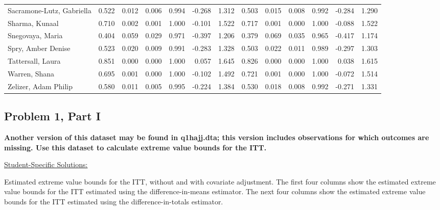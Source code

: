 \documentclass[11pt,notitlepage]{article}
\begin{document}
\begin{table}[h!]
\begin{center}
\begin{tabular}{lrrrrrr|rrrrrr}
  Sacramone-Lutz, Gabriella & 0.522 & 0.012 & 0.006 & 0.994 & -0.268 & 1.312 & 0.503 & 0.015 & 0.008 & 0.992 & -0.284 & 1.290 \\ 
  Sharma, Kunaal & 0.710 & 0.002 & 0.001 & 1.000 & -0.101 & 1.522 & 0.717 & 0.001 & 0.000 & 1.000 & -0.088 & 1.522 \\ 
  Snegovaya, Maria & 0.404 & 0.059 & 0.029 & 0.971 & -0.397 & 1.206 & 0.379 & 0.069 & 0.035 & 0.965 & -0.417 & 1.174 \\ 
  Spry, Amber Denise & 0.523 & 0.020 & 0.009 & 0.991 & -0.283 & 1.328 & 0.503 & 0.022 & 0.011 & 0.989 & -0.297 & 1.303 \\ 
  Tattersall, Laura & 0.851 & 0.000 & 0.000 & 1.000 & 0.057 & 1.645 & 0.826 & 0.000 & 0.000 & 1.000 & 0.038 & 1.615 \\ 
  Warren, Shana & 0.695 & 0.001 & 0.000 & 1.000 & -0.102 & 1.492 & 0.721 & 0.001 & 0.000 & 1.000 & -0.072 & 1.514 \\ 
  Zelizer, Adam Philip & 0.580 & 0.011 & 0.005 & 0.995 & -0.224 & 1.384 & 0.530 & 0.018 & 0.008 & 0.992 & -0.271 & 1.331 \\ 
   \hline
\end{tabular}
\end{center}
\end{table}


\clearpage


\subsection{Problem 1, Part I} {\bf Another version of this dataset may be found in q1hajj.dta; this version includes observations for which outcomes are missing.  Use this dataset to calculate extreme value bounds for the ITT.  }


\vspace{1cm}


\underline{{\sc Student-Specific Solutions:}}

Estimated extreme value bounds for the ITT, without and with covariate adjustment. The first four columns show the estimated extreme value bounds for the ITT estimated using the difference-in-means estimator. The next four columns show the estimated extreme value bounds for the ITT estimated using the difference-in-totals estimator.
\end{document}
